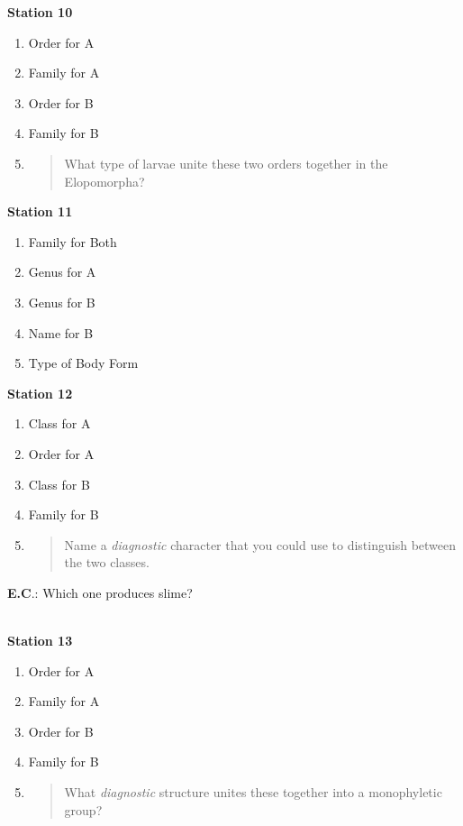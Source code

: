 \textbf{Station 10}

\begin{enumerate}
\def\labelenumi{\arabic{enumi}.}
\setcounter{enumi}{44}
\item
  Order for A
\item
  Family for A
\item
  Order for B
\item
  Family for B
\item
  \begin{quote}
  What type of larvae unite these two orders together in the
  Elopomorpha?
  \end{quote}
\end{enumerate}

\textbf{Station 11}

\begin{enumerate}
\def\labelenumi{\arabic{enumi}.}
\setcounter{enumi}{49}
\item
  Family for Both
\item
  Genus for A
\item
  Genus for B
\item
  Name for B
\item
  Type of Body Form
\end{enumerate}

\textbf{Station 12}

\begin{enumerate}
\def\labelenumi{\arabic{enumi}.}
\setcounter{enumi}{54}
\item
  Class for A
\item
  Order for A
\item
  Class for B
\item
  Family for B
\item
  \begin{quote}
  Name a \emph{diagnostic} character that you could use to distinguish
  between the two classes.
  \end{quote}
\end{enumerate}

\textbf{E.C}.: Which one produces slime?

\textbf{\\
Station 13}

\begin{enumerate}
\def\labelenumi{\arabic{enumi}.}
\setcounter{enumi}{59}
\item
  Order for A
\item
  Family for A
\item
  Order for B
\item
  Family for B
\item
  \begin{quote}
  What \emph{diagnostic} structure unites these together into a
  monophyletic group?
  \end{quote}
\end{enumerate}

